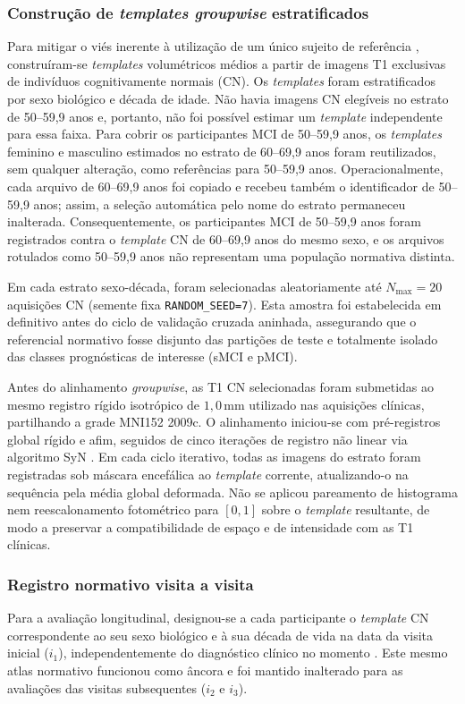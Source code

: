 \documentclass[review]{elsarticle}
\newcommand{\code}[1]{\texttt{#1}}
\begin{document}
	\subsubsection{Construção de \emph{templates groupwise} estratificados}\label{sec:groupwise}
	Para mitigar o viés inerente à utilização de um único sujeito de referência \cite{reuter-2012}, construíram-se \emph{templates} volumétricos médios a partir de imagens T1 exclusivas de indivíduos cognitivamente normais (CN). Os \emph{templates} foram estratificados por sexo biológico e década de idade. Não havia imagens CN elegíveis no estrato de 50--59,9 anos e, portanto, não foi possível estimar um \emph{template} independente para essa faixa. Para cobrir os participantes MCI de 50--59,9 anos, os \emph{templates} feminino e masculino estimados no estrato de 60--69,9 anos foram reutilizados, sem qualquer alteração, como referências para 50--59,9 anos. Operacionalmente, cada arquivo de 60--69,9 anos foi copiado e recebeu também o identificador de 50--59,9 anos; assim, a seleção automática pelo nome do estrato permaneceu inalterada. Consequentemente, os participantes MCI de 50--59,9 anos foram registrados contra o \emph{template} CN de 60--69,9 anos do mesmo sexo, e os arquivos rotulados como 50--59,9 anos não representam uma população normativa distinta.
	
	Em cada estrato sexo-década, foram selecionadas aleatoriamente até $N_{\max}=20$ aquisições CN (semente fixa \code{RANDOM\_SEED=7}). Esta amostra foi estabelecida em definitivo antes do ciclo de validação cruzada aninhada, assegurando que o referencial normativo fosse disjunto das partições de teste e totalmente isolado das classes prognósticas de interesse (sMCI e pMCI).
	
	Antes do alinhamento \emph{groupwise}, as T1 CN selecionadas foram submetidas ao mesmo registro rígido isotrópico de $1{,}0$\,mm utilizado nas aquisições clínicas, partilhando a grade MNI152 2009c. O alinhamento iniciou-se com pré-registros global rígido e afim, seguidos de cinco iterações de registro não linear via algoritmo SyN \cite{avants-2014}. Em cada ciclo iterativo, todas as imagens do estrato foram registradas sob máscara encefálica ao \emph{template} corrente, atualizando-o na sequência pela média global deformada. Não se aplicou pareamento de histograma nem reescalonamento fotométrico para $[0,1]$ sobre o \emph{template} resultante, de modo a preservar a compatibilidade de espaço e de intensidade com as T1 clínicas.
	
	\subsubsection{Registro normativo visita a visita}\label{subsec:deslocamento_longitudinal}
	Para a avaliação longitudinal, designou-se a cada participante o \emph{template} CN correspondente ao seu sexo biológico e à sua década de vida na data da visita inicial ($i_1$), independentemente do diagnóstico clínico no momento \cite{wyman-2013}. Este mesmo atlas normativo funcionou como âncora e foi mantido inalterado para as avaliações das visitas subsequentes ($i_2$ e $i_3$).
	
\end{document}
